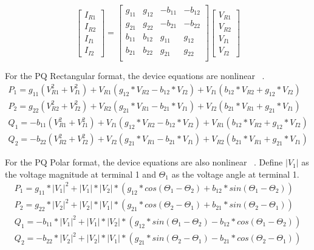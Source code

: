 \begin{equation}
  \left[ \begin{array}{c} I_{R1} \\ I_{R2} \\ I_{I1} \\ I_{I2} 
         \end{array} \right] =
  \left[ \begin{array}{cccc}
      g_{11} & g_{12} & -b_{11} & -b_{12} \\
      g_{21} & g_{22} & -b_{21} & -b_{22} \\
      b_{11} & b_{12} & g_{11} & g_{12} \\
      b_{21} & b_{22} & g_{21} & g_{22} \\
      \end{array} \right] 
  \left[ \begin{array}{c} V_{R1} \\ V_{R2} \\ V_{I1} \\ V_{I2}
         \end{array} \right]
\end{equation}

For the PQ Rectangular format, the device equations are nonlinear ~\cite{Milano}.
\begin{eqnarray}
  P_{1} = g_{11}(V_{R1}^{2} + V_{I1}^{2}) + V_{R1}(g_{12}*V_{R2}-b_{12}*V_{I2})
         + V_{I1}(b_{12}*V_{R2}+g_{12}*V_{I2})\\ 
  P_{2} = g_{22}(V_{R2}^{2} + V_{I2}^{2}) + V_{R2}(g_{21}*V_{R1}-b_{21}*V_{I1})
         + V_{I2}(b_{21}*V_{R1}+g_{21}*V_{I1})\\ 
  Q_{1} = -b_{11}(V_{R1}^{2} + V_{I1}^{2}) + V_{I1}(g_{12}*V_{R2}-b_{12}*V_{I2})
         + V_{R1}(b_{12}*V_{R2}+g_{12}*V_{I2})\\  
  Q_{2} = -b_{22}(V_{R2}^{2} + V_{I2}^{2}) + V_{I2}(g_{21}*V_{R1}-b_{21}*V_{I1})
         + V_{R2}(b_{21}*V_{R1}+g_{21}*V_{I1})
\end{eqnarray}

For the PQ Polar format, the device equations are also nonlinear ~\cite{Milano}. 
Define $|V_{1}|$ as the voltage magnitude at terminal 1 and $\Theta_{1}$ as the 
voltage angle at terminal 1.
\begin{eqnarray}
  P_{1} = g_{11} * |V_{1}|^{2} 
        + |V_{1}| * |V_{2}| * (g_{12}*cos(\Theta_{1}-\Theta_{2}) + b_{12}*sin(\Theta_{1}-\Theta_{2}))\\ 
  P_{2} = g_{22} * |V_{2}|^{2} 
        + |V_{2}| * |V_{1}| * (g_{21}*cos(\Theta_{2}-\Theta_{1}) + b_{21}*sin(\Theta_{2}-\Theta_{1}))\\ 
  Q_{1} =  -b_{11} * |V_{1}|^{2} 
        + |V_{1}| * |V_{2}| * (g_{12}*sin(\Theta_{1}-\Theta_{2}) - b_{12}*cos(\Theta_{1}-\Theta_{2}))\\ 
  Q_{2} =  -b_{22} * |V_{2}|^{2} 
        + |V_{2}| * |V_{1}| * (g_{21}*sin(\Theta_{2}-\Theta_{1}) - b_{21}*cos(\Theta_{2}-\Theta_{1}))
\end{eqnarray}

